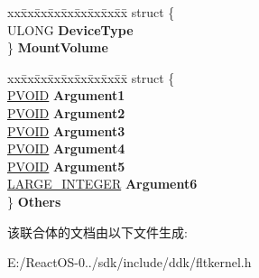 \begin{DoxyCompactItemize}
\begin{tabbing}
\end{tabbing}\item 
\mbox{\label{union___f_l_t___p_a_r_a_m_e_t_e_r_s_a375832f4d444212a3a94eef7687d3c1e}} 
\begin{tabbing}
xx\=xx\=xx\=xx\=xx\=xx\=xx\=xx\=xx\=\kill
struct \{\\
\>ULONG {\bfseries DeviceType}\\
\} {\bfseries MountVolume}\\

\end{tabbing}\item 
\mbox{\label{union___f_l_t___p_a_r_a_m_e_t_e_r_s_a7dd72d1a150a99f477ffb8f6ade669b5}} 
\begin{tabbing}
xx\=xx\=xx\=xx\=xx\=xx\=xx\=xx\=xx\=\kill
struct \{\\
\>\hyperlink{interfacevoid}{PVOID} {\bfseries Argument1}\\
\>\hyperlink{interfacevoid}{PVOID} {\bfseries Argument2}\\
\>\hyperlink{interfacevoid}{PVOID} {\bfseries Argument3}\\
\>\hyperlink{interfacevoid}{PVOID} {\bfseries Argument4}\\
\>\hyperlink{interfacevoid}{PVOID} {\bfseries Argument5}\\
\>\hyperlink{union___l_a_r_g_e___i_n_t_e_g_e_r}{LARGE\_INTEGER} {\bfseries Argument6}\\
\} {\bfseries Others}\\

\end{tabbing}\end{DoxyCompactItemize}


该联合体的文档由以下文件生成\+:\begin{DoxyCompactItemize}
\item 
E\+:/\+React\+O\+S-\/0../sdk/include/ddk/fltkernel.\+h\end{DoxyCompactItemize}
